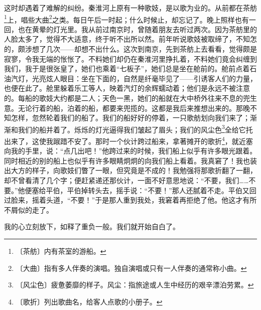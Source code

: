 \documentclass[12pt,UTF-8,openany]{ctexbook}
\begin{document}
\begin{normalsize}
    这时却遇着了难解的纠纷。秦淮河上原有一种歌妓，是以歌为业的。从前都在茶舫\footnote{〔茶舫〕内有茶室的游船。}上，唱些大曲\footnote{〔大曲〕指有多人伴奏的演唱。独自演唱或只有一人伴奏的通常称小曲。}之类。每日午后一时起；什么时候止，却忘记了。晚上照样也有一回，也在黄晕的灯光里。我从前过南京时，曾随着朋友去听过两次。因为茶舫里的人脸太多了，觉得不大适意，终于听不出所以然。前年听说歌妓被取缔了，不知怎的，颇涉想了几次——却想不出什么。这次到南京，先到茶舫上去看看，觉得颇是寂寥，令我无端的怅怅了。不料她们却仍在秦淮河里挣扎着，不料她们竟会纠缠到我们，我于是很张皇了，她们也乘着“七板子”，她们总是坐在舱前的。舱前点着石油汽灯，光亮炫人眼目：坐在下面的，自然是纤毫毕见了——引诱客人们的力量，也便在此了。舱里躲着乐工等人，映着汽灯的余辉蠕动着；他们是永远不被注意的。每船的歌妓大约都是二人；天色一黑，她们的船就在大中桥外往来不息的兜生意。无论行着的船，泊着的船，都要来兜揽的。这都是我后来推想出来的。那晚不知怎样，忽然轮着我们的船了。我们的船好好的停着，一只歌舫划向我们来了；渐渐和我们的船并着了。烁烁的灯光逼得我们皱起了眉头；我们的风尘色\footnote{〔风尘色〕疲惫萎靡的样子。风尘：指旅途或人生中经历的艰辛漂泊劳累。}全给它托出来了，这使我踧踖不安了。那时一个伙计跨过船来，拿著摊开的歌折\footnote{〔歌折〕列出歌曲名，给客人点歌的小册子。}，就近塞向我的手里，说：“点几出吧！”他跨过来的时候，我们船上似乎有许多眼光跟着。同时相近的别的船上也似乎有许多眼睛炯炯的向我们船上看着。我真窘了！我也装出大方的样子，向歌妓们瞥了一眼，但究竟是不成的！我勉强将那歌折翻了一翻，却不曾看清了几个字；便赶紧递还那伙计，一面不好意思地说：“不要，我们……不要。”他便塞给平伯，平伯掉转头去，摇手说：“不要！”那人还腻着不走。平伯又回过脸来，摇着头道，“不要！”于是那人重到我处，我窘着再拒绝了他。他这才有所不屑似的走了。
    
    我的心立刻放下，如释了重负一般。我们就开始自白了。
    

\end{normalsize}
\end{document}
